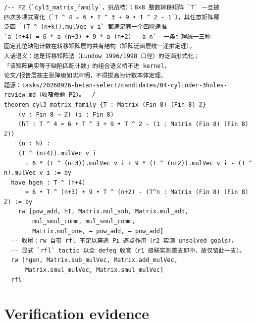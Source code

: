 \documentclass[11pt]{article}
\begin{document}
\begin{lstlisting}[caption={Complete development, verbatim: lines 1--69 (the whole file) of the frozen \texttt{final/04-proof-complete.lean}, sha256 \texttt{566e9e1d...c5ae8}.},label={lst:full}]
/-- P2（`cyl3_matrix_family`，挑战档）：8×8 整数转移矩阵 `T` 一旦被
四次多项式零化（`T ^ 4 = 6 • T ^ 3 + 9 • T ^ 2 - 1`），其任意矩阵幂
泛函 `(T ^ (n+k)).mulVec v i` 都满足同一个四阶递推
`a (n+4) = 6 * a (n+3) + 9 * a (n+2) - a n`——一条引理统一三种
固定孔位缺陷计数在转移矩阵层的共有结构（矩阵泛函层统一递推定理）。
人话语义：这是转移矩阵法（Lundow 1996/1998 口径）的泛函形式化；
「该矩阵确实等于缺陷匹配计数」的组合语义桥不进 kernel，
论文/报告层按主张降级如实声明，不得拔高为计数本体定理。
题源：tasks/20260926-beian-select/candidates/04-cylinder-3holes-review.md（收窄命题 P2）。 -/
theorem cyl3_matrix_family {T : Matrix (Fin 8) (Fin 8) ℤ}
    (v : Fin 8 → ℤ) (i : Fin 8)
    (hT : T ^ 4 = 6 • T ^ 3 + 9 • T ^ 2 - (1 : Matrix (Fin 8) (Fin 8) ℤ))
    (n : ℕ) :
    (T ^ (n+4)).mulVec v i
      = 6 * (T ^ (n+3)).mulVec v i + 9 * (T ^ (n+2)).mulVec v i - (T ^ n).mulVec v i := by
  have hgen : T ^ (n+4)
      = 6 • T ^ (n+3) + 9 • T ^ (n+2) - (T^n : Matrix (Fin 8) (Fin 8) ℤ) := by
    rw [pow_add, hT, Matrix.mul_sub, Matrix.mul_add,
        mul_smul_comm, mul_smul_comm,
        Matrix.mul_one, ← pow_add, ← pow_add]
  -- 收尾：rw 自带 rfl 不足以穿透 Pi 逐点作用（r2 实测 unsolved goals），
  -- 显式 `rfl` tactic 以全 defeq 收官（r1 级联实测首支即中，故仅留此一支）。
  rw [hgen, Matrix.sub_mulVec, Matrix.add_mulVec,
      Matrix.smul_mulVec, Matrix.smul_mulVec]
  rfl
\end{lstlisting}

\section{Verification evidence}
\end{document}
